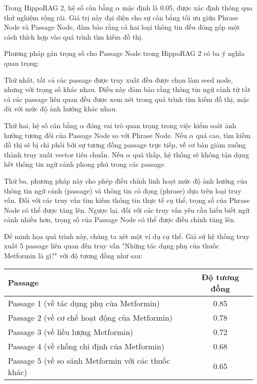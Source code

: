 \documentclass[../main.tex]{subfiles}
\begin{document}
Trong HippoRAG 2, hệ số cân bằng \(\alpha\) mặc định là 0.05, được xác định thông qua thử nghiệm rộng rãi. Giá trị này đại diện cho sự cân bằng tối ưu giữa Phrase Node và Passage Node, đảm bảo rằng cả hai loại thông tin đều đóng góp một cách thích hợp vào quá trình tìm kiếm đồ thị.

Phương pháp gán trọng số cho Passage Node trong HippoRAG 2 có ba ý nghĩa quan trọng:

Thứ nhất, tất cả các passage được truy xuất đều được chọn làm seed node, nhưng với trọng số khác nhau. Điều này đảm bảo rằng thông tin ngữ cảnh từ tất cả các passage liên quan đều được xem xét trong quá trình tìm kiếm đồ thị, mặc dù với mức độ ảnh hưởng khác nhau.

Thứ hai, hệ số cân bằng \(\alpha\) đóng vai trò quan trọng trong việc kiểm soát ảnh hưởng tương đối của Passage Node so với Phrase Node. Nếu \(\alpha\) quá cao, tìm kiếm đồ thị sẽ bị chi phối bởi sự tương đồng passage trực tiếp, về cơ bản giảm xuống thành truy xuất vector tiêu chuẩn. Nếu \(\alpha\) quá thấp, hệ thống sẽ không tận dụng hết thông tin ngữ cảnh phong phú trong các passage.

Thứ ba, phương pháp này cho phép điều chỉnh linh hoạt mức độ ảnh hưởng của thông tin ngữ cảnh (passage) và thông tin cô đọng (phrase) dựa trên loại truy vấn. Đối với các truy vấn tìm kiếm thông tin thực tế cụ thể, trọng số của Phrase Node có thể được tăng lên. Ngược lại, đối với các truy vấn yêu cầu hiểu biết ngữ cảnh nhiều hơn, trọng số của Passage Node có thể được điều chỉnh tăng lên.

Để minh họa quá trình này, chúng ta xét một ví dụ cụ thể. Giả sử hệ thống truy xuất 5 passage liên quan đến truy vấn "Những tác dụng phụ của thuốc Metformin là gì?" với độ tương đồng như sau:

\begin{table}[h]
\centering
\begin{tabular}{|l|c|}
\hline
\textbf{Passage} & \textbf{Độ tương đồng} \\
\hline
Passage 1 (về tác dụng phụ của Metformin) & 0.85 \\
\hline
Passage 2 (về cơ chế hoạt động của Metformin) & 0.78 \\
\hline
Passage 3 (về liều lượng Metformin) & 0.72 \\
\hline
Passage 4 (về chống chỉ định của Metformin) & 0.68 \\
\hline
Passage 5 (về so sánh Metformin với các thuốc khác) & 0.65 \\
\hline
\end{tabular}
\end{table}
\end{document}
